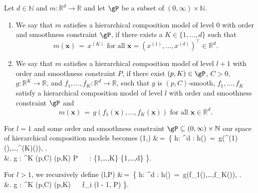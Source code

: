 \documentclass[twoside,11pt]{article}
\begin{document}
\begin{definition}
\label{def_h_c_model}
Let \( d \in \mathbb{N} \) and \( m: \mathbb{R}^d \rightarrow \mathbb{R} \) and let \( \gP \) be a subset of \( (0,\infty) \times \mathbb{N} \).
\begin{enumerate}[label=\alph*)]
  \item We say that \( m \) satisfies a hierarchical composition model of level 0 with order and smoothness constraint \( \gP \), if there exists a \( K \in \{1,\ldots,d\} \) such that
  \[ m(\mathbf{x}) \,=\, x^{(K)} \text{ for all } \mathbf{x} = (x^{(1)},\ldots,x^{(d)})^\top \in \mathbb{R}^d. \]
  \item We say that \( m \) satisfies a hierarchical composition model of level \( l+1 \) with order and smoothness constraint \( P \), if there exist \( (p,K) \in \gP \), \( C > 0 \), \( g : \mathbb{R}^K \rightarrow \mathbb{R} \), and \( f_1,\ldots,f_K : \mathbb{R}^d \rightarrow \mathbb{R} \), such that \( g \) is \( (p,C) \)-smooth, \( f_1,\ldots,f_K \) satisfy a hierarchical composition model of level \( l \) with order and smoothness constraint \( \gP \) and
  \[ m(\mathbf{x}) \,=\, g(f_1(\mathbf{x}),\ldots,f_K(\mathbf{x})) \text{ for all } \mathbf{x} \in \mathbb{R}^d. \]
\end{enumerate}
\end{definition}

For \( l = 1 \) and some order and smoothness constraint \( \gP \subseteq (0,\infty) \times \mathbb{N} \) our space of hierarchical composition models becomes
\bea
{}(1,\gP) &\,=\, \left\{ h: ^d \rightarrow {} : h() \,=\, g(\pi^{(1)}(),\ldots,\pi^{(K)}()), \right. \\ 
&\left. g : ^K \rightarrow {}  (p,C) (p,K) \in P \,\,\,\,\,\, \pi : \{1,\ldots,K\} \rightarrow \{1,\ldots,d\} \right\}. 
\bea 

For \( l > 1 \), we recursively define
\bea 
{}(l,P) &\,=\, \left\{ h: ^d \rightarrow {} : h() \,=\, g(f_1(),\ldots,f_K()),  \right. \\ 
&\left. g : ^K \rightarrow {}  (p,C) (p,K) \in \gP \,\,\,\,\,\, f_i \in {}(l - 1, P) \right\}.
\bea 
\end{document}

